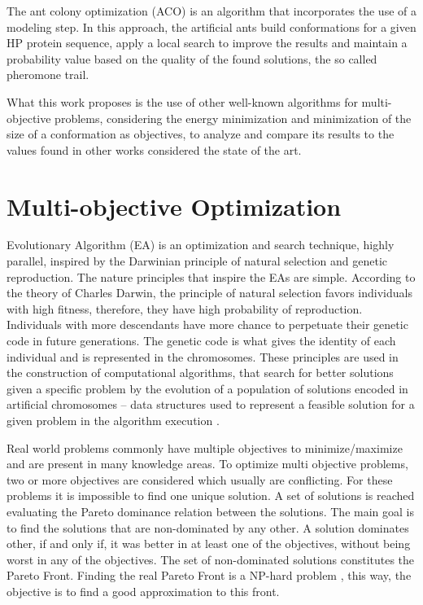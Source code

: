 The ant colony optimization (ACO) \cite{shmygelska2002ant, shmygelska2003improved} is an algorithm that incorporates the use of a modeling step. In this approach, the artificial ants build conformations for a given HP protein sequence, apply a local search to improve the results and maintain a probability value based on the quality of the found solutions, the so called pheromone trail.


What this work proposes is the use of other well-known algorithms for multi-objective problems, considering the energy minimization and minimization of the size of a conformation as objectives, to analyze and compare its results to the values found in other works considered the state of the art.


\section{Multi-objective Optimization} \label{sec:optimization}


Evolutionary Algorithm (EA) is an optimization and search technique, highly parallel, inspired by the Darwinian principle of natural selection and genetic reproduction. The nature principles that inspire the EAs are simple. According to the theory of Charles Darwin, the principle of natural selection favors individuals with high fitness, therefore, they have high probability of reproduction. Individuals with more descendants have more chance to perpetuate their genetic code in future generations. The genetic code is what gives the identity of each individual and is represented in the chromosomes. These principles are used in the construction of computational algorithms, that search for better solutions given a specific problem by the evolution of a population of solutions encoded in artificial chromosomes -- data structures used to represent a feasible solution for a given problem in the algorithm execution \cite{pacheco1999algoritmos}.


Real world problems commonly have multiple objectives to minimize/maximize and are present in many knowledge areas. To optimize multi objective problems, two or more objectives are considered which usually are conflicting. For these problems it is impossible to find one unique solution. A set of solutions is reached evaluating the Pareto dominance relation \cite{pareto} between the solutions. The main goal is to find the solutions that are non-dominated by any other. A solution dominates other, if and only if, it was better in at least one of the objectives, without being worst in any of the objectives. The set of non-dominated solutions constitutes the Pareto Front. Finding the real Pareto Front is a NP-hard problem \cite{fonseca2005tutorial}, this way, the objective is to find a good approximation to this front.


